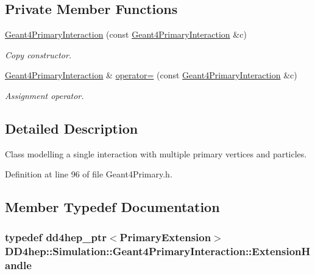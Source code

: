\subsection*{Private Member Functions}
\begin{DoxyCompactItemize}
\item 
\hyperlink{class_d_d4hep_1_1_simulation_1_1_geant4_primary_interaction_a5ffd12789ddae75709c4677e4a6a7cac}{Geant4PrimaryInteraction} (const \hyperlink{class_d_d4hep_1_1_simulation_1_1_geant4_primary_interaction}{Geant4PrimaryInteraction} \&c)
\begin{DoxyCompactList}\small\item\em Copy constructor. \item\end{DoxyCompactList}\item 
\hyperlink{class_d_d4hep_1_1_simulation_1_1_geant4_primary_interaction}{Geant4PrimaryInteraction} \& \hyperlink{class_d_d4hep_1_1_simulation_1_1_geant4_primary_interaction_a5def4b2b6d8741d91310f05af3336cb6}{operator=} (const \hyperlink{class_d_d4hep_1_1_simulation_1_1_geant4_primary_interaction}{Geant4PrimaryInteraction} \&c)
\begin{DoxyCompactList}\small\item\em Assignment operator. \item\end{DoxyCompactList}\end{DoxyCompactItemize}


\subsection{Detailed Description}
Class modelling a single interaction with multiple primary vertices and particles. 

Definition at line 96 of file Geant4Primary.h.

\subsection{Member Typedef Documentation}
\hypertarget{class_d_d4hep_1_1_simulation_1_1_geant4_primary_interaction_a9d53c6c8fa2e7a6094ba91854af945f4}{
\subsubsection[{ExtensionHandle}]{\setlength{\rightskip}{0pt plus 5cm}typedef {\bf dd4hep\_\-ptr}$<${\bf PrimaryExtension}$>$ {\bf DD4hep::Simulation::Geant4PrimaryInteraction::ExtensionHandle}}}
\label{class_d_d4hep_1_1_simulation_1_1_geant4_primary_interaction_a9d53c6c8fa2e7a6094ba91854af945f4}


